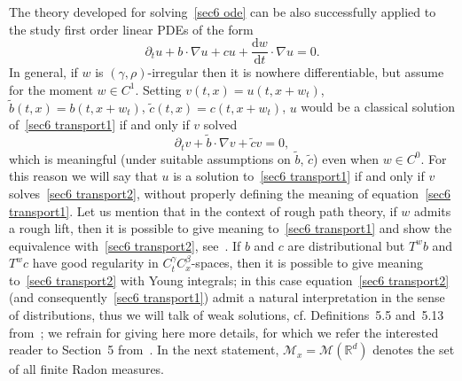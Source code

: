\documentclass[10pt]{article}
\newcommand{\mathd}{\mathrm{d}}
\begin{document}
The theory developed for solving~\eqref{sec6 ode} can be also successfully
applied to the study first order linear PDEs of the form
\begin{equation}
  \partial_t u + b \cdot \nabla u + c u + \frac{\mathd w}{\mathd t} \cdot
  \nabla u = 0. \label{sec6 transport1}
\end{equation}
In general, if $w$ is $(\gamma, \rho)$\mbox{-}irregular then it is nowhere
differentiable, but assume for the moment $w \in C^1$. Setting $v (t, x) = u
(t, x + w_t)$, $\tilde{b} (t, x) = b (t, x + w_t)$, $\tilde{c} (t, x) = c (t,
x + w_t)$, $u$ would be a classical solution of~\eqref{sec6 transport1} if and
only if $v$ solved
\begin{equation}
  \partial_t v + \tilde{b} \cdot \nabla v + \tilde{c} v = 0, \label{sec6
  transport2}
\end{equation}
which is meaningful (under suitable assumptions on $\tilde{b}$, $\tilde{c}$)
even when $w \in C^0$. For this reason we will say that $u$ is a solution
to~\eqref{sec6 transport1} if and only if $v$ solves~\eqref{sec6 transport2},
without properly defining the meaning of equation~\eqref{sec6 transport1}. Let
us mention that in the context of rough path theory, if $w$ admits a rough
lift, then it is possible to give meaning to~\eqref{sec6 transport1} and show
the equivalence with~\eqref{sec6 transport2}, see~{\cite{catellier}}. If $b$
and $c$ are distributional but $T^w b$ and $T^w c$ have good regularity in
$C^{\gamma}_t C^{\beta}_x$\mbox{-}spaces, then it is possible to give meaning
to~\eqref{sec6 transport2} with Young integrals; in this case
equation~\eqref{sec6 transport2} (and consequently~\eqref{sec6 transport1})
admit a natural interpretation in the sense of distributions, thus we will
talk of weak solutions, cf. Definitions~5.5 and~5.13
from~{\cite{galeatigubinelli_ode}}; we refrain for giving here more details,
for which we refer the interested reader to Section~5
from~{\cite{galeatigubinelli_ode}}. In the next statement, $\mathcal{M}_x =
\mathcal{M} (\mathbb{R}^d)$ denotes the set of all finite Radon measures.
\end{document}
